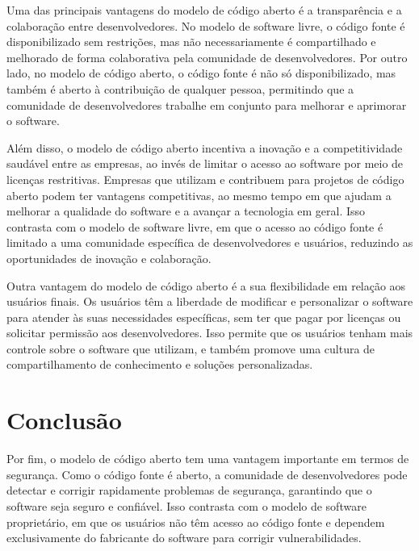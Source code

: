 \documentclass[
	12pt,				%
	oneside,			%
	a4paper,			%
	english,			%
	brazil				%
	]{abntex2ppgsi}
\begin{document}
Uma das principais vantagens do modelo de código aberto é a transparência e a colaboração entre desenvolvedores. No modelo de software livre, o código fonte é disponibilizado sem restrições, mas não necessariamente é compartilhado e melhorado de forma colaborativa pela comunidade de desenvolvedores. Por outro lado, no modelo de código aberto, o código fonte é não só disponibilizado, mas também é aberto à contribuição de qualquer pessoa, permitindo que a comunidade de desenvolvedores trabalhe em conjunto para melhorar e aprimorar o software.

Além disso, o modelo de código aberto incentiva a inovação e a competitividade saudável entre as empresas, ao invés de limitar o acesso ao software por meio de licenças restritivas. Empresas que utilizam e contribuem para projetos de código aberto podem ter vantagens competitivas, ao mesmo tempo em que ajudam a melhorar a qualidade do software e a avançar a tecnologia em geral. Isso contrasta com o modelo de software livre, em que o acesso ao código fonte é limitado a uma comunidade específica de desenvolvedores e usuários, reduzindo as oportunidades de inovação e colaboração.

Outra vantagem do modelo de código aberto é a sua flexibilidade em relação aos usuários finais. Os usuários têm a liberdade de modificar e personalizar o software para atender às suas necessidades específicas, sem ter que pagar por licenças ou solicitar permissão aos desenvolvedores. Isso permite que os usuários tenham mais controle sobre o software que utilizam, e também promove uma cultura de compartilhamento de conhecimento e soluções personalizadas.

\section{Conclusão}
 
Por fim, o modelo de código aberto tem uma vantagem importante em termos de segurança. Como o código fonte é aberto, a comunidade de desenvolvedores pode detectar e corrigir rapidamente problemas de segurança, garantindo que o software seja seguro e confiável. Isso contrasta com o modelo de software proprietário, em que os usuários não têm acesso ao código fonte e dependem exclusivamente do fabricante do software para corrigir vulnerabilidades.
\end{document}
